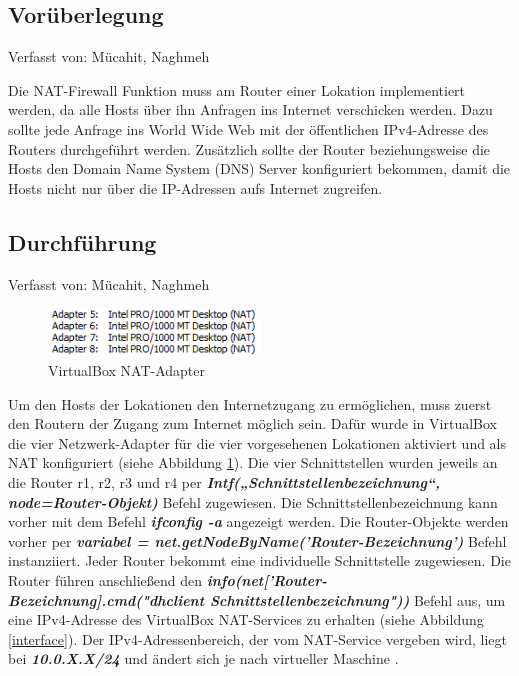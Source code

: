 \documentclass[fontsize=12pt,paper=a4,open=any,parskip=half,
  twoside=false,toc=listof,toc=bibliography,fleqn,leqno,
  captions=nooneline,captions=tableabove,british]{scrbook}
\begin{document}
\subsection{Vorüberlegung}
{\tiny Verfasst von: Mücahit, Naghmeh\par}
Die NAT-Firewall Funktion muss am Router einer Lokation implementiert werden, da alle Hosts über ihn Anfragen ins Internet verschicken werden. Dazu sollte jede Anfrage ins World Wide Web mit der öffentlichen IPv4-Adresse des Routers durchgeführt werden. Zusätzlich sollte der Router beziehungsweise die Hosts den Domain Name System (DNS) Server konfiguriert bekommen, damit die Hosts nicht nur über die IP-Adressen aufs Internet zugreifen.

\subsection{Durchführung}
{\tiny Verfasst von: Mücahit, Naghmeh\par}
\begin{figure}
	\vspace{-\baselineskip}
 	\centering
 	\includegraphics[width=0.5\textwidth]{Bilder/adapter}
 	\captionsetup{justification=centering}
 	\caption{VirtualBox NAT-Adapter}
	\label{adapter}
\end{figure}

Um den Hosts der Lokationen den Internetzugang zu ermöglichen, muss zuerst den Routern der Zugang zum Internet möglich sein. Dafür wurde in VirtualBox die vier Netzwerk-Adapter für die vier vorgesehenen Lokationen aktiviert und als NAT konfiguriert (siehe Abbildung \ref{adapter}). 
Die vier Schnittstellen wurden jeweils an die Router r1, r2, r3 und r4 per \textit{\textbf{Intf(„Schnittstellenbezeichnung“, node=Router-Objekt)}} Befehl zugewiesen. Die Schnittstellenbezeichnung kann vorher mit dem Befehl \textit{\textbf{ifconfig -a}} angezeigt werden. Die Router-Objekte werden vorher per \textit{\textbf{variabel = net.getNodeByName('Router-Bezeichnung')}} Befehl instanziiert. Jeder Router bekommt eine individuelle Schnittstelle zugewiesen. Die Router führen anschließend den \textit{\textbf{info(net['Router-Bezeichnung].cmd("dhclient Schnittstellenbezeichnung"))}} Befehl aus, um eine IPv4-Adresse des VirtualBox NAT-Services zu erhalten (siehe Abbildung \ref{interface}). Der IPv4-Adressenbereich, der vom NAT-Service vergeben wird, liegt bei \textit{\textbf{10.0.X.X/24}} und ändert sich je nach virtueller Maschine \cite{NATing} \cite{NATgateway}.
\end{document}
